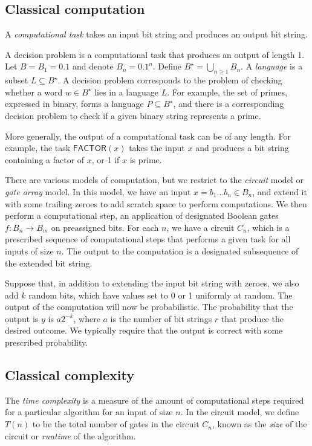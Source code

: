 \subsection{Classical computation}
A \emph{computational task} takes an input bit string and produces an output bit string.

A decision problem is a computational task that produces an output of length 1.
Let \( B = B_1 = \qty{0,1} \) and denote \( B_n = \qty{0,1}^n \).
Define \( B^\star = \bigcup_{n \geq 1} B_n \).
A \emph{language} is a subset \( L \subseteq B^\star \).
A decision problem corresponds to the problem of checking whether a word \( w \in B^\star \) lies in a language \( L \).
For example, the set of primes, expressed in binary, forms a language \( P \subseteq B^\star \), and there is a corresponding decision problem to check if a given binary string represents a prime.

More generally, the output of a computational task can be of any length.
For example, the task \( \mathsf{FACTOR}(x) \) takes the input \( x \) and produces a bit string containing a factor of \( x \), or 1 if \( x \) is prime.

There are various models of computation, but we restrict to the \emph{circuit} model or \emph{gate array} model.
In this model, we have an input \( x = b_1 \dots b_n \in B_n \), and extend it with some trailing zeroes to add scratch space to perform computations.
We then perform a computational step, an application of designated Boolean gates \( f \colon B_n \to B_m \) on preassigned bits.
For each \( n \), we have a circuit \( C_n \), which is a prescribed sequence of computational steps that performs a given task for all inputs of size \( n \).
The output to the computation is a designated subsequence of the extended bit string.

Suppose that, in addition to extending the input bit string with zeroes, we also add \( k \) random bits, which have values set to 0 or 1 uniformly at random.
The output of the computation will now be probabilistic.
The probability that the output is \( y \) is \( a2^{-k} \), where \( a \) is the number of bit strings \( r \) that produce the desired outcome.
We typically require that the output is correct with some prescribed probability.

\subsection{Classical complexity}
The \emph{time complexity} is a measure of the amount of computational steps required for a particular algorithm for an input of size \( n \).
In the circuit model, we define \( T(n) \) to be the total number of gates in the circuit \( C_n \), known as the \emph{size} of the circuit or \emph{runtime} of the algorithm.

